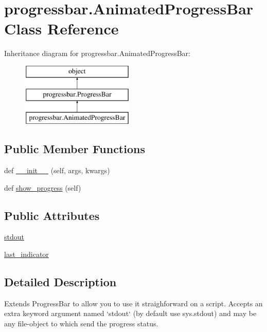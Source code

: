 \hypertarget{classprogressbar_1_1AnimatedProgressBar}{}\section{progressbar.\+Animated\+Progress\+Bar Class Reference}
\label{classprogressbar_1_1AnimatedProgressBar}
Inheritance diagram for progressbar.\+Animated\+Progress\+Bar\+:\begin{figure}[H]
\begin{center}
\leavevmode
\includegraphics[height=3.000000cm]{classprogressbar_1_1AnimatedProgressBar}
\end{center}
\end{figure}
\subsection*{Public Member Functions}
\begin{DoxyCompactItemize}
\item 
def \hyperlink{classprogressbar_1_1AnimatedProgressBar_ac5fb173f8610ea6caa27306a60a8903f}{\+\_\+\+\_\+init\+\_\+\+\_\+} (self, args, kwargs)
\item 
def \hyperlink{classprogressbar_1_1AnimatedProgressBar_a87d45550598b83128ee14b4d7acdea27}{show\+\_\+progress} (self)
\end{DoxyCompactItemize}
\subsection*{Public Attributes}
\begin{DoxyCompactItemize}
\item 
\hyperlink{classprogressbar_1_1AnimatedProgressBar_aa4bc611ade566c28f1c54e5608a2a200}{stdout}
\item 
\hyperlink{classprogressbar_1_1AnimatedProgressBar_a50c3cb9a4b317224bd600047efb761d2}{last\+\_\+indicator}
\end{DoxyCompactItemize}


\subsection{Detailed Description}
\begin{DoxyVerb}Extends ProgressBar to allow you to use it straighforward on a script.
Accepts an extra keyword argument named `stdout` (by default use sys.stdout)
and may be any file-object to which send the progress status.
\end{DoxyVerb}
 

